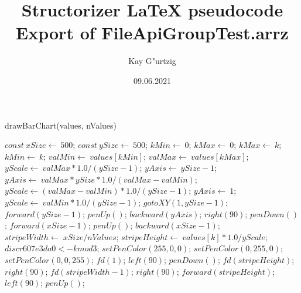 \documentclass[a4paper,10pt]{article}
\title{Structorizer LaTeX pseudocode Export of FileApiGroupTest.arrz}
\author{Kay G"urtzig}
\date{09.06.2021}
\begin{document}
\begin{algorithm}
\caption{drawBarChart(values, nValues)}
\begin{algorithmic}[5]

\STATE {}
\STATE {}
\STATE {}
\STATE {}
  \STATE \(const\ xSize\gets\ 500\);
  \STATE \(const\ ySize\gets\ 500\);
  \STATE \(kMin\gets\ 0\);
  \STATE \(kMax\gets\ 0\);
      \STATE \(kMax\gets\ k\);
    \ELSE
        \STATE \(kMin\gets\ k\);
      \ENDIF
    \ENDIF
  \ENDFOR
  \STATE \(valMin\gets\ values[kMin]\);
  \STATE \(valMax\gets\ values[kMax]\);
  \STATE \(yScale\gets\ valMax*1.0/(ySize-1)\);
  \STATE \(yAxis\gets\ ySize-1\);
      \STATE \(yAxis\gets\ valMax*ySize*1.0/(valMax-valMin)\);
      \STATE \(yScale\gets(valMax-valMin)*1.0/(ySize-1)\);
    \ELSE
      \STATE \(yAxis\gets\ 1\);
      \STATE \(yScale\gets\ valMin*1.0/(ySize-1)\);
    \ENDIF
  \ENDIF
  \STATE \(gotoXY(1,ySize-1)\);
  \STATE \(forward(ySize-1)\);
  \STATE \(penUp()\);
  \STATE \(backward(yAxis)\);
  \STATE \(right(90)\);
  \STATE \(penDown()\);
  \STATE \(forward(xSize-1)\);
  \STATE \(penUp()\);
  \STATE \(backward(xSize-1)\);
  \STATE \(stripeWidth\gets\ xSize/nValues\);
    \STATE \(stripeHeight\gets\ values[k]*1.0/yScale\);
    \STATE \(discr607e3da0 <- k mod 3\);
      \STATE \(setPenColor(255,0,0)\);
      \STATE \(setPenColor(0,255,0)\);
      \STATE \(setPenColor(0,0,255)\);
    \ENDIF
    \STATE \(fd(1)\);
    \STATE \(left(90)\);
    \STATE \(penDown()\);
    \STATE \(fd(stripeHeight)\);
    \STATE \(right(90)\);
    \STATE \(fd(stripeWidth-1)\);
    \STATE \(right(90)\);
    \STATE \(forward(stripeHeight)\);
    \STATE \(left(90)\);
    \STATE \(penUp()\);
  \ENDFOR

\end{algorithmic}
\end{algorithm}
\end{document}
